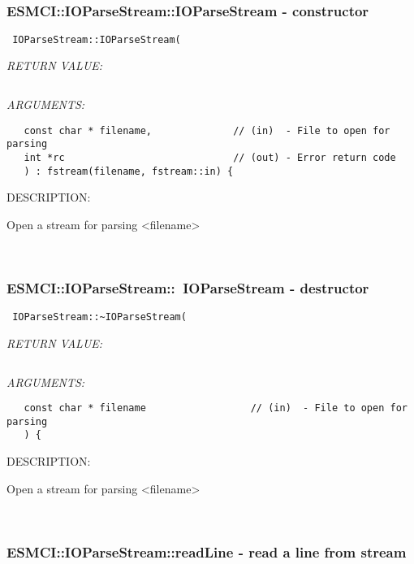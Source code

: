 \mbox{}\hrulefill\
 
\subsubsection [ESMCI::IOParseStream::IOParseStream] {ESMCI::IOParseStream::IOParseStream - constructor}


  
\begin{verbatim} IOParseStream::IOParseStream(\end{verbatim}{\em RETURN VALUE:}
\begin{verbatim} \end{verbatim}{\em ARGUMENTS:}
\begin{verbatim}   const char * filename,              // (in)  - File to open for parsing
   int *rc                             // (out) - Error return code
   ) : fstream(filename, fstream::in) {\end{verbatim}
{\sf DESCRIPTION:\\ }


      Open a stream for parsing <filename>
 
   
 
\mbox{}\hrulefill\
 
\subsubsection [ESMCI::IOParseStream::~IOParseStream] {ESMCI::IOParseStream::~IOParseStream - destructor}


  
\begin{verbatim} IOParseStream::~IOParseStream(\end{verbatim}{\em RETURN VALUE:}
\begin{verbatim} \end{verbatim}{\em ARGUMENTS:}
\begin{verbatim}   const char * filename                  // (in)  - File to open for parsing
   ) {\end{verbatim}
{\sf DESCRIPTION:\\ }


      Open a stream for parsing <filename>
 
   
 
\mbox{}\hrulefill\
 
\subsubsection [ESMCI::IOParseStream::readLine] {ESMCI::IOParseStream::readLine - read a line from stream}


